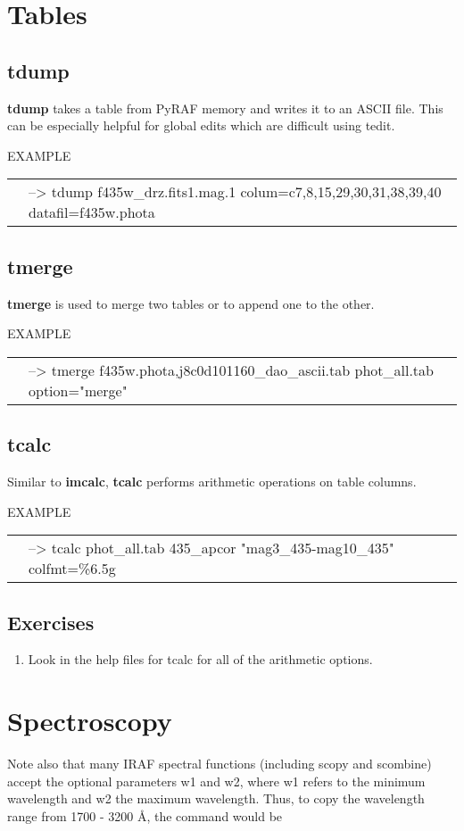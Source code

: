 \section{Tables}
\subsection{{\bf tdump}}
{\bf tdump} takes a table from PyRAF memory and writes it to an ASCII file. This can be especially helpful for global edits which are difficult using tedit.


EXAMPLE

\begin{tabular}{ll}
& {\color{RoyalBlue} --> tdump f435w\_drz.fits1.mag.1 colum=c7,8,15,29,30,31,38,39,40 datafil=f435w.phota} \\
\end{tabular}

\subsection{{\bf tmerge}}
{\bf tmerge} is used to merge two tables or to append one to the other. 

EXAMPLE

\begin{tabular}{ll}
& {\color{RoyalBlue}--> tmerge f435w.phota,j8c0d101160\_dao\_ascii.tab    phot\_all.tab option="merge"}
\end{tabular}

\subsection{{\bf tcalc}}
Similar to {\bf imcalc}, {\bf tcalc} performs arithmetic operations on table columns.

EXAMPLE

\begin{tabular}{ll}
& {\color{RoyalBlue} --> tcalc  phot\_all.tab     435\_apcor   "mag3\_435-mag10\_435"  colfmt=\%6.5g}
\end{tabular}

\subsection{Exercises}
\begin{enumerate}
\item Look in the help files for tcalc for all of the arithmetic options. 
\end{enumerate} 

\section{Spectroscopy}
Note also that many IRAF spectral functions (including scopy and scombine) accept the optional parameters w1 and w2, where w1 refers to the minimum wavelength and w2 the maximum wavelength. Thus, to copy the wavelength range from 1700 - 3200 \AA, the command would be 

